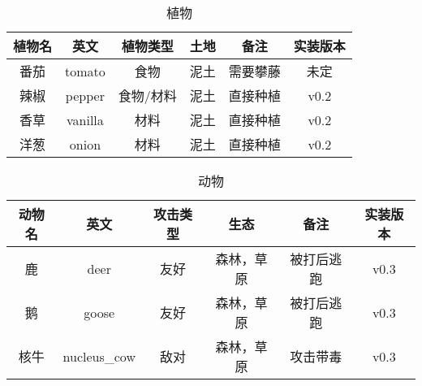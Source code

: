 \begin{table}[H]
    \centering
    \caption{植物}
    \setlength{\tabcolsep}{4mm}
    \begin{tabular}{c|ccc|cc}
        \toprule
        \textbf{植物名} & \textbf{英文} & \textbf{植物类型} & \textbf{土地} & \textbf{备注} & \textbf{实装版本} \\
        \midrule
        番茄            & tomato        & 食物              & 泥土          & 需要攀藤      & 未定              \\
        辣椒            & pepper        & 食物/材料         & 泥土          & 直接种植      & v0.2              \\
        香草            & vanilla       & 材料              & 泥土          & 直接种植      & v0.2              \\
        洋葱            & onion         & 材料              & 泥土          & 直接种植      & v0.2              \\
        \bottomrule
    \end{tabular}
\end{table}

\begin{table}[H]
    \centering
    \caption{动物}
    \setlength{\tabcolsep}{4mm}
    \begin{tabular}{c|ccc|cc}
        \toprule
        \textbf{动物名} & \textbf{英文} & \textbf{攻击类型} & \textbf{生态} & \textbf{备注} & \textbf{实装版本} \\
        \midrule
        鹿              & deer          & 友好              & 森林，草原    & 被打后逃跑    & v0.3              \\
        鹅              & goose         & 友好              & 森林，草原    & 被打后逃跑    & v0.3              \\
        核牛            & nucleus\_cow  & 敌对              & 森林，草原    & 攻击带毒      & v0.3              \\
        \bottomrule
    \end{tabular}
\end{table}

\newpage